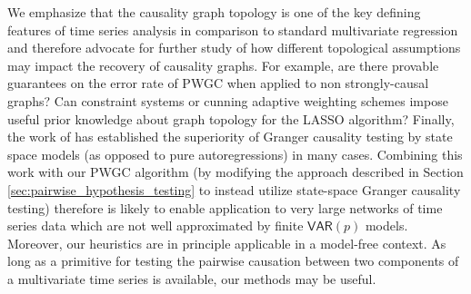 \documentclass{statsoc}
\def\VAR{\mathsf{VAR}}  %
\begin{document}
We emphasize that the causality graph topology is one of the key
defining features of time series analysis in comparison to standard
multivariate regression and therefore advocate for further study of
how different topological assumptions may impact the recovery of
causality graphs.  For example, are there provable guarantees on the
error rate of PWGC when applied to non strongly-causal graphs?  Can
constraint systems or cunning adaptive weighting schemes impose useful
prior knowledge about graph topology for the LASSO algorithm?
Finally, the work of \cite{barnett2015granger} has established the
superiority of Granger causality testing by state space models (as
opposed to pure autoregressions) in many cases.  Combining this work
with our PWGC algorithm (by modifying the approach described in
Section \ref{sec:pairwise_hypothesis_testing} to instead utilize
state-space Granger causality testing) therefore is likely to enable
application to very large networks of time series data which are not
well approximated by finite $\VAR(p)$ models.  Moreover, our
heuristics are in principle applicable in a model-free context.  As
long as a primitive for testing the pairwise causation between two
components of a multivariate time series is available, our methods may
be useful.


\end{document}
